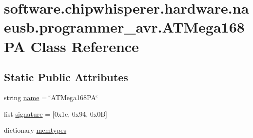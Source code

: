 \hypertarget{classsoftware_1_1chipwhisperer_1_1hardware_1_1naeusb_1_1programmer__avr_1_1ATMega168PA}{}\section{software.\+chipwhisperer.\+hardware.\+naeusb.\+programmer\+\_\+avr.\+A\+T\+Mega168\+P\+A Class Reference}
\label{classsoftware_1_1chipwhisperer_1_1hardware_1_1naeusb_1_1programmer__avr_1_1ATMega168PA}
\subsection*{Static Public Attributes}
\begin{DoxyCompactItemize}
\item 
string \hyperlink{classsoftware_1_1chipwhisperer_1_1hardware_1_1naeusb_1_1programmer__avr_1_1ATMega168PA_ad293db3b69fc4d8f71350a657039bfa2}{name} = \char`\"{}A\+T\+Mega168\+P\+A\char`\"{}
\item 
list \hyperlink{classsoftware_1_1chipwhisperer_1_1hardware_1_1naeusb_1_1programmer__avr_1_1ATMega168PA_a15680bfcabb39c2127f878eb436594be}{signature} = \mbox{[}0x1e, 0x94, 0x0\+B\mbox{]}
\item 
dictionary \hyperlink{classsoftware_1_1chipwhisperer_1_1hardware_1_1naeusb_1_1programmer__avr_1_1ATMega168PA_a6446da65abe27256f7dfad3710f840ac}{memtypes}
\end{DoxyCompactItemize}


